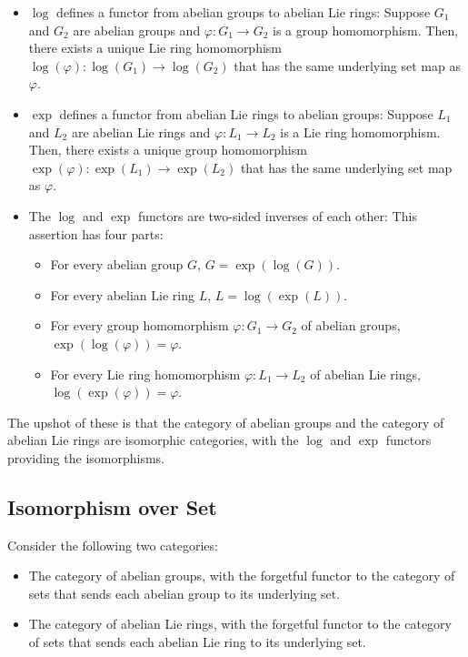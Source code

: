 \begin{itemize}
\item $\log$ defines a functor from abelian groups to abelian Lie
  rings: Suppose $G_1$ and $G_2$ are abelian groups and $\varphi:G_1
  \to G_2$ is a group homomorphism. Then, there exists a unique Lie
  ring homomorphism $\log(\varphi): \log(G_1) \to \log(G_2)$ that has
  the same underlying set map as $\varphi$.
\item $\exp$ defines a functor from abelian Lie rings to abelian
  groups: Suppose $L_1$ and $L_2$ are abelian Lie rings and $\varphi:L_1
  \to L_2$ is a Lie ring homomorphism. Then, there exists a unique
  group homomorphism $\exp(\varphi): \exp(L_1) \to \exp(L_2)$ that has
  the same underlying set map as $\varphi$.
\item The $\log$ and $\exp$ functors are two-sided inverses of each
  other: This assertion has four parts:
  \begin{itemize}
    \item For every abelian group $G$, $G = \exp(\log(G))$. 
    \item For every abelian Lie ring $L$, $L = \log(\exp(L))$.
    \item For every group homomorphism $\varphi:G_1 \to G_2$ of
      abelian groups, $\exp(\log(\varphi)) = \varphi$.
    \item For every Lie ring homomorphism $\varphi:L_1 \to L_2$ of
      abelian Lie rings, $\log(\exp(\varphi)) = \varphi$.
  \end{itemize}
\end{itemize}

The upshot of these is that the category of abelian groups and the
category of abelian Lie rings are isomorphic categories, with the
$\log$ and $\exp$ functors providing the isomorphisms.
\subsection{Isomorphism over Set}

Consider the following two categories:

\begin{itemize}
\item The category of abelian groups, with the forgetful functor to
  the category of sets that sends each abelian group to its underlying
  set.
\item The category of abelian Lie rings, with the forgetful functor to
  the category of sets that sends each abelian Lie ring to its
  underlying set.
\end{itemize}

